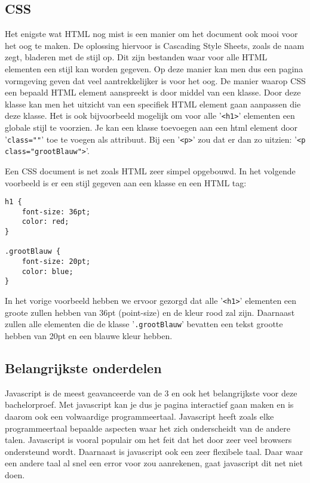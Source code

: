 \subsection{CSS}
Het enigste wat HTML nog mist is een manier om het document ook mooi voor het oog te maken. De oplossing hiervoor is Cascading Style Sheets, zoals de naam zegt, bladeren met de stijl op. Dit zijn bestanden waar voor alle HTML elementen een stijl kan worden gegeven. Op deze manier kan men dus een pagina vormgeving geven dat veel aantrekkelijker is voor het oog. De manier waarop CSS een bepaald HTML element aanspreekt is door middel van een klasse. Door deze klasse kan men het uitzicht van een specifiek HTML element gaan aanpassen die deze klasse. Het is ook bijvoorbeeld mogelijk om voor alle '\lstinline[basicstyle=\ttfamily\color{red}]|<h1>|' elementen een globale stijl te voorzien. Je kan een klasse toevoegen aan een html element door '\lstinline[basicstyle=\ttfamily\color{red}]|class=""|' toe te voegen als attribuut. Bij een '\lstinline[basicstyle=\ttfamily\color{red}]|<p>|' zou dat er dan zo uitzien: '\lstinline[basicstyle=\ttfamily\color{red}]|<p class="grootBlauw">|'.

Een CSS document is net zoals HTML zeer simpel opgebouwd. In het volgende voorbeeld is er een stijl gegeven aan een klasse en een HTML tag:

\begin{lstlisting}[frame=single, caption=Voorbeeld van een CSS bestand]
h1 {
	font-size: 36pt;
	color: red;
}

.grootBlauw {
	font-size: 20pt;
	color: blue;
}
\end{lstlisting}

In het vorige voorbeeld hebben we ervoor gezorgd dat alle '\lstinline[basicstyle=\ttfamily\color{red}]|<h1>|' elementen een groote zullen hebben van 36pt (point-size) en de kleur rood zal zijn. Daarnaast zullen alle elementen die de klasse '\lstinline[basicstyle=\ttfamily\color{red}]|.grootBlauw|' bevatten een tekst grootte hebben van 20pt en een blauwe kleur hebben.

\subsection{Belangrijkste onderdelen}
\label{subsec:Web VR}
Javascript is de meest geavanceerde van de 3 en ook het belangrijkste voor deze bachelorproef. Met javascript kan je dus je pagina interactief gaan maken en is daarom ook een volwaardige programmeertaal. Javascript heeft zoals elke programmeertaal bepaalde aspecten waar het zich onderscheidt van de andere talen. Javascript is vooral populair om het feit dat het door zeer veel browsers ondersteund wordt. Daarnaast is javascript ook een zeer flexibele taal. Daar waar een andere taal al snel een error voor zou aanrekenen, gaat javascript dit net niet doen. 

